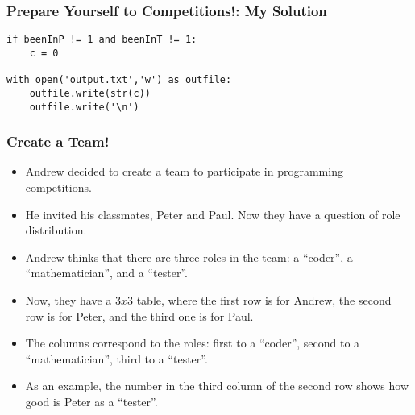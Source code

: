 \begin{frame}[fragile]\frametitle{Prepare Yourself to Competitions!: My Solution}
\begin{lstlisting}
if beenInP != 1 and beenInT != 1:
	c = 0
	
with open('output.txt','w') as outfile:
	outfile.write(str(c))
	outfile.write('\n')
\end{lstlisting}
\end{frame}

\begin{frame}[fragile]\frametitle{Create a Team!}
\begin{itemize}
\item  Andrew decided to create a team to participate in programming competitions. 
\item He invited his classmates, Peter and Paul. Now they have a question of role distribution. 
\item Andrew thinks that there are three roles in the team: a ``coder'', a ``mathematician'', and a ``tester''. 
\item Now, they have a $3x3$ table, where the first row is for Andrew, the second row is for Peter, and the third one is for Paul. 
\item The columns correspond to the roles: first to a ``coder'', second to a ``mathematician'', third to a ``tester''. 
\item As an example, the number in the third column of the second row shows how good is Peter as a ``tester''.
\end{itemize}
\end{frame}

